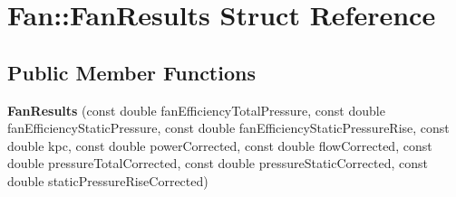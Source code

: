 \hypertarget{struct_fan_1_1_fan_results}{}\section{Fan\+:\+:Fan\+Results Struct Reference}
\label{struct_fan_1_1_fan_results}
\subsection*{Public Member Functions}
\begin{DoxyCompactItemize}
\item 
\mbox{\label{struct_fan_1_1_fan_results_aa66036c86bef47f147c855e61645c45f}} 
{\bfseries Fan\+Results} (const double fan\+Efficiency\+Total\+Pressure, const double fan\+Efficiency\+Static\+Pressure, const double fan\+Efficiency\+Static\+Pressure\+Rise, const double kpc, const double power\+Corrected, const double flow\+Corrected, const double pressure\+Total\+Corrected, const double pressure\+Static\+Corrected, const double static\+Pressure\+Rise\+Corrected)
\end{DoxyCompactItemize}
